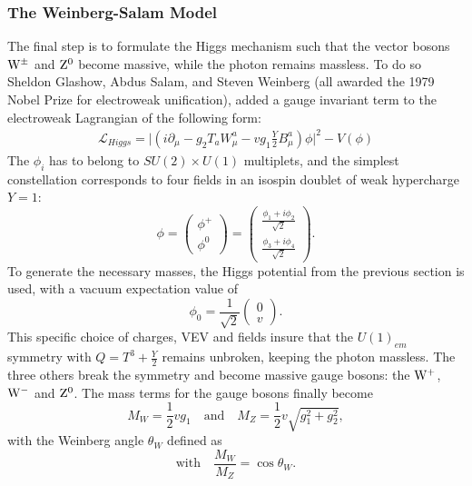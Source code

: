 \subsubsection{The Weinberg-Salam Model}
The final step is to formulate the Higgs mechanism such that the vector bosons $\mathrm{W}^{\pm}$ and $\mathrm{Z}^{0}$ become massive, while the photon remains massless. To do so Sheldon Glashow, Abdus Salam, and Steven Weinberg (all awarded the 1979 Nobel Prize for electroweak unification), added a gauge invariant term to the electroweak Lagrangian of the following form:
 \begin{align}
   \label{eq:theory:higgsmass}
  \mathcal{L}_{Higgs}= \big|(i\partial_{\mu} - g_2 T_a W_{\mu}^a -vg_1 \frac{Y}{2} B_{\mu}^a) \phi\big| ^2-V(\phi)
 \end{align}
The $\phi_i$ has to belong to $SU(2) \times U(1)$ multiplets, and the simplest constellation corresponds to four fields in an isospin doublet of weak hypercharge $Y=1$:
\begin{equation}
\phi =  \begin{pmatrix} \phi^{+} \\ \phi^{0} \end{pmatrix}= \begin{pmatrix} \frac{\phi_1+i\phi_2}{\sqrt{2}} \\ \frac{\phi_3+i\phi_4}{\sqrt{2}}\end{pmatrix}.
\end{equation}
To generate the necessary masses, the Higgs potential from the previous section is used, with a vacuum expectation value of
\begin{equation}
\phi_0 = \frac{1}{\sqrt{2}}  \begin{pmatrix} 0 \\ v \end{pmatrix}.
\end{equation}
This specific choice of charges, VEV and fields insure that the $U(1)_{em}$ symmetry with $Q=T^3+\frac{Y}{2}$ remains unbroken, keeping the photon massless. The three others break the symmetry and become massive gauge bosons: the $\mathrm{W}^{+}$, $\mathrm{W}^{-}$ and $\mathrm{Z}^{0}$. The mass terms for the gauge bosons finally become
\begin{equation}
M_W=\frac{1}{2}vg_1 \quad \textrm{and} \quad M_Z =\frac{1}{2}v\sqrt{g_1^2+g_2^2},
\end{equation}
with the Weinberg angle $\theta_W$ defined as
\begin{equation}
\textrm{with}\quad\frac{M_W}{M_Z}=\cos \theta_W.
\end{equation}
